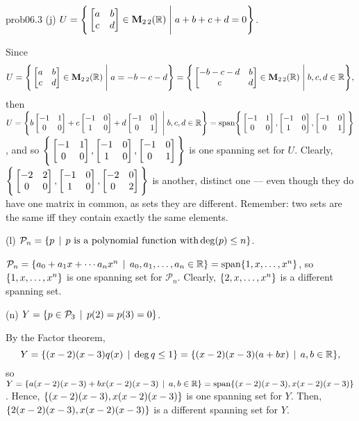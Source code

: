 \begin{sol}{prob06.3}
 \medskip
(j)  $U=\Bigg\{  \bmatrix a&b\\ c&d\endbmatrix \in \M_{2 \,2}(\R) \;\Bigg|\; a+b+c+d=0\Bigg\}$.   

\soln

Since $$U=\Bigg\{  \bmatrix a&b\\ c&d\endbmatrix \in \M_{2 \,2}(\R) \;\Bigg|\; a=-b-c-d\Bigg\}=\Bigg\{  \bmatrix -b-c-d&b\\ c&d\endbmatrix \in \M_{2 \,2}(\R) \;\Bigg|\; b,c,d\in \R\Bigg\},$$ then $U=\Bigg\{b \bmatrix -1 &1\\ 0&0\endbmatrix+c \bmatrix -1&0\\ 1&0\endbmatrix+ d\bmatrix -1&0\\ 0&1\endbmatrix \;\Bigg|\; b,c,d\in \R\Bigg\}=\text{span}\Bigg\{ \bmatrix -1 &1\\ 0&0\endbmatrix,\bmatrix -1&0\\ 1&0\endbmatrix,  \bmatrix -1&0\\ 0&1\endbmatrix \Bigg\}$, and so $\Bigg\{ \bmatrix -1 &1\\ 0&0\endbmatrix,\bmatrix -1&0\\ 1&0\endbmatrix,  \bmatrix -1&0\\ 0&1\endbmatrix \Bigg\}$ is one spanning set for $U$. Clearly, $\Bigg\{ \bmatrix -2 &2\\ 0&0\endbmatrix,\bmatrix -1&0\\ 1&0\endbmatrix,  \bmatrix -2&0\\ 0&2\endbmatrix \Bigg\}$ is another, distinct one --- even though they do have one matrix in common, as sets they are different. Remember: two sets are the same iff they contain exactly the same elements.
   \medskip

(l) $ \mathcal P_n=\{p\,\mid \, p \text{ is a polynomial function with} \deg(p)\le n \} $.

\soln $ \mathcal P_n=\{a_0 + a_1 x +\cdots a_n x^n \,\mid \, a_0, a_1, \dots, a_n \in \mathbb{R} \}=\textrm{span}\{1, x, \dots, x^n\}$, so $\{1, x, \dots, x^n \}$ is one spanning set for $ \mathcal P_n$. Clearly, $\{2, x, \dots, x^n \}$ is a different spanning set.\medskip 
%

(n)  $ Y=\{p \in \mathcal P_3 \,\mid \,  p(2)=p(3)=0 \}$. 

\soln By the Factor theorem, $$Y=\{(x-2)(x-3)q(x)\,\mid \, \deg q \le 1 \}=\{(x-2)(x-3)(a+bx)\,\mid \, a,b \in \mathbb{R} \},$$so $Y=\{a(x-2)(x-3) + b x(x-2)(x-3)\,\mid \, a,b \in \mathbb{R}  \}=\textrm{span}\{(x-2)(x-3), x(x-2)(x-3)\}$. Hence, $\{(x-2)(x-3), x(x-2)(x-3) \}$ is one spanning set for $Y$.  Then, $\{2(x-2)(x-3), x(x-2)(x-3) \}$ is a different spanning set for $Y$.
\medskip
%



\end{sol}
